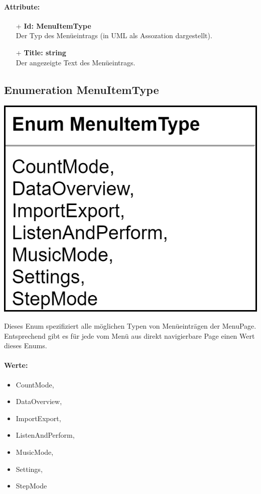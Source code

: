 \documentclass[a4paper,12pt]{article}
\begin{document}
	\paragraph{Attribute:}
	\begin{itemize}
		\item [+] \textbf{Id: MenuItemType}\\ Der Typ des Menüeintrags (in UML als Assozation dargestellt).
		\item [+] \textbf{Title: string}\\ Der angezeigte Text des Menüeintrags.
	\end{itemize}
\begin{minipage}[b]{0.7\textwidth}

	\subsection{Enumeration MenuItemType}
\end{minipage}
\begin{minipage}[c]{0.3\textwidth}
	\includegraphics[width=\textwidth]{bilder/ViewmodelKlassen/MenuItemType.png}
	\vspace{0.3cm}
\end{minipage}

	Dieses Enum spezifiziert alle möglichen Typen von Menüeinträgen der MenuPage. Entsprechend gibt es für jede vom Menü aus direkt navigierbare Page einen Wert dieses Enums.\\
	\paragraph{Werte:}
	\begin{itemize}
        \item CountMode,
        \item DataOverview,
        \item ImportExport,
        \item ListenAndPerform,
        \item MusicMode,
        \item Settings,
        \item StepMode
	\end{itemize}
\end{document}
